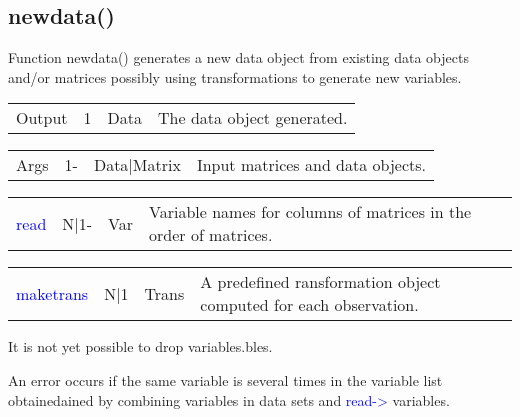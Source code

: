 \subsection{newdata()}
\label{newdata}
Function \textcolor{VioletRed}{newdata}() generates a new data object from existing data objects and/or
matrices possibly using transformations to generate new variables.
\begin{table}[H]
\begin{tabular}{ m{}  m{}m{}p{}}
Output&1&Data&The data object generated.
\\ \cline{1-4}
\end{tabular}
\end{table}
\vspace{-1.51em}
\begin{table}[H]
\begin{tabular}{ m{}  m{}m{}p{}}
Args&1-&Data|Matrix& Input matrices and data objects.
\\ \cline{1-4}
\end{tabular}
\end{table}
\vspace{-1.51em}
\begin{table}[H]
\begin{tabular}{ m{}  m{}m{}p{}}
\textcolor{blue}{read}&N|1-&Var& Variable names for columns of matrices in the order of
matrices.
\\ \cline{1-4}
\end{tabular}
\end{table}
\vspace{-1.51em}
\begin{table}[H]
\begin{tabular}{ m{}  m{}m{}p{}}
\textcolor{blue}{maketrans}&N|1& Trans & A predefined ransformation object computed for each observation.
\\ \cline{1-4}
\end{tabular}
\end{table}
\begin{note}
It is not yet possible to drop variables.bles.
\end{note}
\begin{note}
An error occurs if the same variable is several times in the variable list obtainedained
by combining variables in data sets and \textcolor{blue}{read->} variables.
\end{note}

